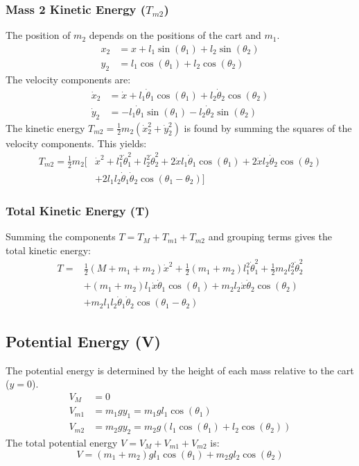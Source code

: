 \documentclass[12pt]{article}
\begin{document}
	\subsubsection{Mass 2 Kinetic Energy ($T_{m2}$)}
	The position of $m_2$ depends on the positions of the cart and $m_1$.
	\begin{align*}
		x_2 &= x + l_1 \sin(\theta_1) + l_2 \sin(\theta_2) \\
		y_2 &= l_1 \cos(\theta_1) + l_2 \cos(\theta_2)
	\end{align*}
	The velocity components are:
	\begin{align*}
		\dot{x}_2 &= \dot{x} + l_1 \dot{\theta}_1 \cos(\theta_1) + l_2 \dot{\theta}_2 \cos(\theta_2) \\
		\dot{y}_2 &= -l_1 \dot{\theta}_1 \sin(\theta_1) - l_2 \dot{\theta}_2 \sin(\theta_2)
	\end{align*}
	The kinetic energy $T_{m2} = \frac{1}{2} m_2 (\dot{x}_2^2 + \dot{y}_2^2)$ is found by summing the squares of the velocity components. This yields:
	\begin{align*}
		T_{m2} = \frac{1}{2} m_2 \Big[ & \dot{x}^2 + l_1^2 \dot{\theta}_1^2 + l_2^2 \dot{\theta}_2^2 + 2\dot{x}l_1\dot{\theta}_1\cos(\theta_1) + 2\dot{x}l_2\dot{\theta}_2\cos(\theta_2) \\
		&+ 2l_1l_2\dot{\theta}_1\dot{\theta}_2\cos(\theta_1-\theta_2) \Big]
	\end{align*}
	
	\subsubsection{Total Kinetic Energy (T)}
	Summing the components $T = T_M + T_{m1} + T_{m2}$ and grouping terms gives the total kinetic energy:
	\begin{align*}
		T = & \frac{1}{2} (M + m_1 + m_2) \dot{x}^2 + \frac{1}{2} (m_1 + m_2) l_1^2 \dot{\theta}_1^2 + \frac{1}{2} m_2 l_2^2 \dot{\theta}_2^2 \\
		&+ (m_1 + m_2) l_1 \dot{x} \dot{\theta}_1 \cos(\theta_1) + m_2 l_2 \dot{x} \dot{\theta}_2 \cos(\theta_2) \\
		&+ m_2 l_1 l_2 \dot{\theta}_1 \dot{\theta}_2 \cos(\theta_1 - \theta_2)
	\end{align*}
	
	\subsection{Potential Energy (V)}
	The potential energy is determined by the height of each mass relative to the cart ($y=0$).
	\begin{align*}
		V_M &= 0 \\
		V_{m1} &= m_1 g y_1 = m_1 g l_1 \cos(\theta_1) \\
		V_{m2} &= m_2 g y_2 = m_2 g (l_1 \cos(\theta_1) + l_2 \cos(\theta_2))
	\end{align*}
	The total potential energy $V = V_M + V_{m1} + V_{m2}$ is:
	\begin{equation*}
		V = (m_1 + m_2) g l_1 \cos(\theta_1) + m_2 g l_2 \cos(\theta_2)
	\end{equation*}
	
\end{document}
